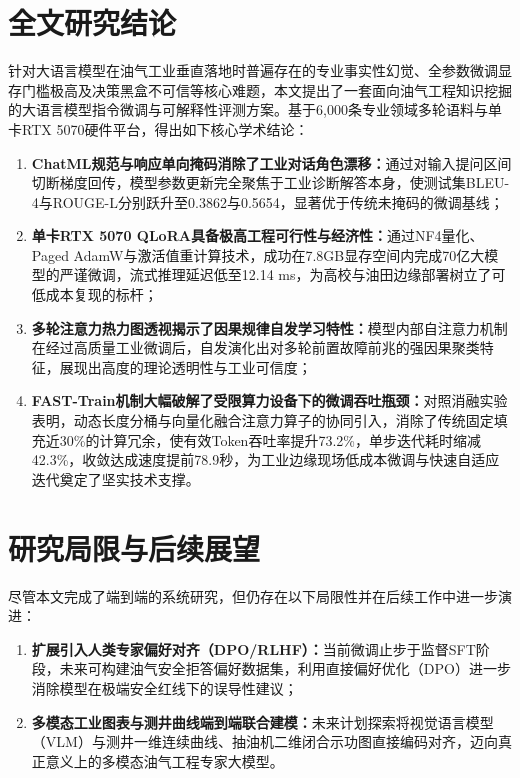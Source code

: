 \documentclass[UTF8,a4paper,zihao=-4,openany,twoside]{ctexbook}
\begin{document}
\section{全文研究结论}
针对大语言模型在油气工业垂直落地时普遍存在的专业事实性幻觉、全参数微调显存门槛极高及决策黑盒不可信等核心难题，本文提出了一套面向油气工程知识挖掘的大语言模型指令微调与可解释性评测方案。基于6,000条专业领域多轮语料与单卡RTX 5070硬件平台，得出如下核心学术结论：
\begin{enumerate}
    \item \textbf{ChatML规范与响应单向掩码消除了工业对话角色漂移：}通过对输入提问区间切断梯度回传，模型参数更新完全聚焦于工业诊断解答本身，使测试集BLEU-4与ROUGE-L分别跃升至0.3862与0.5654，显著优于传统未掩码的微调基线；
    \item \textbf{单卡RTX 5070 QLoRA具备极高工程可行性与经济性：}通过NF4量化、Paged AdamW与激活值重计算技术，成功在7.8GB显存空间内完成70亿大模型的严谨微调，流式推理延迟低至12.14 ms，为高校与油田边缘部署树立了可低成本复现的标杆；
    \item \textbf{多轮注意力热力图透视揭示了因果规律自发学习特性：}模型内部自注意力机制在经过高质量工业微调后，自发演化出对多轮前置故障前兆的强因果聚类特征，展现出高度的理论透明性与工业可信度；
    \item \textbf{FAST-Train机制大幅破解了受限算力设备下的微调吞吐瓶颈：}对照消融实验表明，动态长度分桶与向量化融合注意力算子的协同引入，消除了传统固定填充近30\%的计算冗余，使有效Token吞吐率提升73.2\%，单步迭代耗时缩减42.3\%，收敛达成速度提前78.9秒，为工业边缘现场低成本微调与快速自适应迭代奠定了坚实技术支撑。
\end{enumerate}

\section{研究局限与后续展望}
尽管本文完成了端到端的系统研究，但仍存在以下局限性并在后续工作中进一步演进：
\begin{enumerate}
    \item \textbf{扩展引入人类专家偏好对齐（DPO/RLHF）：}当前微调止步于监督SFT阶段，未来可构建油气安全拒答偏好数据集，利用直接偏好优化（DPO）进一步消除模型在极端安全红线下的误导性建议；
    \item \textbf{多模态工业图表与测井曲线端到端联合建模：}未来计划探索将视觉语言模型（VLM）与测井一维连续曲线、抽油机二维闭合示功图直接编码对齐，迈向真正意义上的多模态油气工程专家大模型。
\end{enumerate}

\appendix
\end{document}
